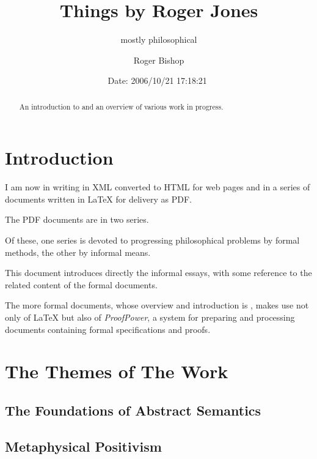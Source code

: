 \documentclass[numreferences]{rbjk}
\begin{document}
                                                                                   
\begin{article}
\begin{opening}  
\title{Things by Roger Jones}
\subtitle{mostly philosophical}
\author{Roger Bishop }
\date{$ $Date: 2006/10/21 17:18:21 $ $}

\begin{abstract}
An introduction to and an overview of various work in progress.
\end{abstract}




\end{opening}

\section{Introduction}

I am now in writing in XML converted to HTML for web pages and in a
series of documents written in LaTeX for delivery as PDF.

The PDF documents are in two series.

Of these, one series is devoted to progressing philosophical problems
by formal methods, the other by informal means.

This document introduces directly the informal essays, with some
reference to the related content of the formal documents.

The more formal documents, whose overview and introduction is \cite{rbjt000}, makes use not only of {\LaTeX} but also of {\it ProofPower}, a system for preparing and processing documents containing formal specifications and proofs.

\section{The Themes of The Work}

\subsection{The Foundations of Abstract Semantics}

\subsection{Metaphysical Positivism}


\end{article}
\end{document}
